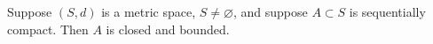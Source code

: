 Suppose $(S, d)$ is a metric space, $S \neq \varnothing$, and suppose $A \subset S$ is sequentially compact. Then $A$ is closed and bounded.
